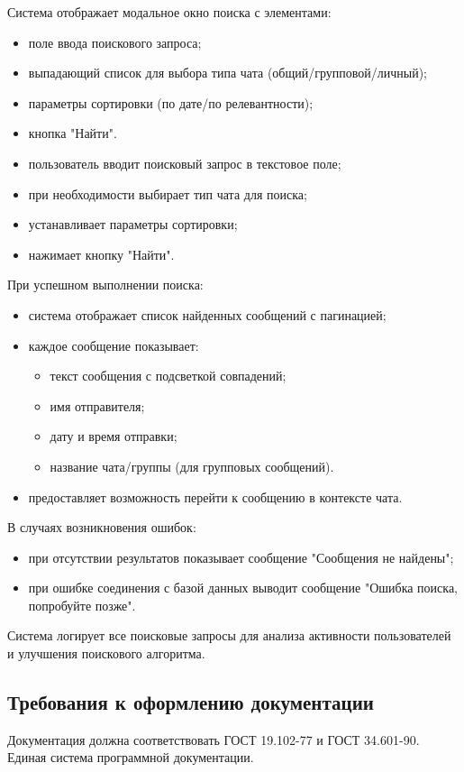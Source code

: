 Система отображает модальное окно поиска с элементами:
\begin{itemize}
	\item поле ввода поискового запроса;
	\item выпадающий список для выбора типа чата (общий/групповой/личный);
	\item параметры сортировки (по дате/по релевантности);
	\item кнопка "Найти".
\end{itemize}

\begin{itemize}
	\item пользователь вводит поисковый запрос в текстовое поле;
	\item при необходимости выбирает тип чата для поиска;
	\item устанавливает параметры сортировки;
	\item нажимает кнопку "Найти".
\end{itemize}

При успешном выполнении поиска:
\begin{itemize}
	\item система отображает список найденных сообщений с пагинацией;
	\item каждое сообщение показывает:
	\begin{itemize}
		\item текст сообщения с подсветкой совпадений;
		\item имя отправителя;
		\item дату и время отправки;
		\item название чата/группы (для групповых сообщений).
	\end{itemize}
	\item предоставляет возможность перейти к сообщению в контексте чата.
\end{itemize}

В случаях возникновения ошибок:
\begin{itemize}
	\item при отсутствии результатов показывает сообщение "Сообщения не найдены";
	\item при ошибке соединения с базой данных выводит сообщение "Ошибка поиска, попробуйте позже".
\end{itemize}

Система логирует все поисковые запросы для анализа активности пользователей и улучшения поискового алгоритма.

\subsection{Требования к оформлению документации}

Документация должна соответствовать ГОСТ 19.102-77 и ГОСТ 34.601-90. Единая система программной документации.